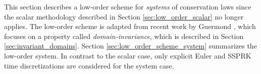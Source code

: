This section describes a low-order scheme for \emph{systems}
of conservation laws since the scalar methodology described in Section
\ref{sec:low_order_scalar} no longer applies. The low-order
scheme is adapted from recent work by Guermond \cite{guermond_invariantdomain},
which focuses on a property called \emph{domain-invariance},
which is described in Section \ref{sec:invariant_domains}. Section
\ref{sec:low_order_scheme_system} summarizes the low-order system.
In contrast to the scalar case, only explicit Euler and SSPRK time
discretizations are considered for the system case.
